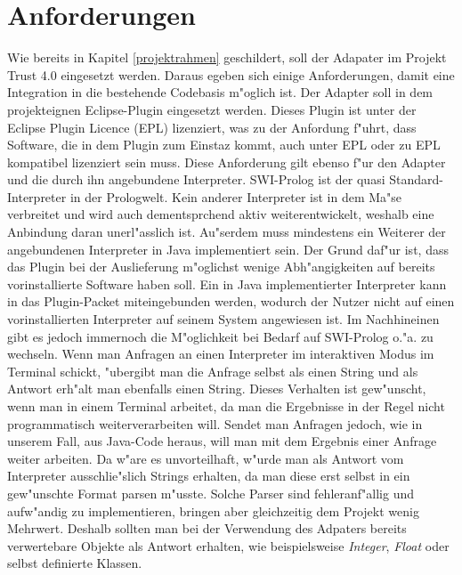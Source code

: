 

\section{Anforderungen}
\label{anfo}
Wie bereits in Kapitel \ref{projektrahmen} geschildert, soll der Adapater im Projekt Trust 4.0 eingesetzt werden. Daraus egeben sich einige Anforderungen, damit eine Integration in die bestehende Codebasis m"oglich ist.\newline
Der Adapter soll in dem projekteignen Eclipse-Plugin eingesetzt werden. Dieses Plugin ist unter der Eclipse Plugin Licence (EPL)\cite{epl} lizenziert, was zu der Anfordung f"uhrt, dass Software, die in dem Plugin zum Einstaz kommt, auch unter EPL oder zu EPL kompatibel lizenziert sein muss. Diese Anforderung gilt ebenso f"ur den Adapter und die durch ihn angebundene Interpreter.\newline
SWI-Prolog\cite{swi} ist der quasi Standard-Interpreter in der Prologwelt. Kein anderer Interpreter ist in dem Ma"se verbreitet und wird auch dementsprchend aktiv weiterentwickelt, weshalb eine Anbindung daran unerl"asslich ist. Au"serdem muss mindestens ein Weiterer der angebundenen Interpreter in Java implementiert sein. Der Grund daf"ur ist, dass das Plugin bei der Auslieferung m"oglichst wenige Abh"angigkeiten auf bereits vorinstallierte Software haben soll. Ein in Java implementierter Interpreter kann in das Plugin-Packet miteingebunden werden, wodurch der Nutzer nicht auf einen vorinstallierten Interpreter auf seinem System angewiesen ist. Im Nachhineinen gibt es jedoch immernoch die M"oglichkeit bei Bedarf auf SWI-Prolog o."a. zu wechseln.\newline
Wenn man Anfragen an einen Interpreter im interaktiven Modus im Terminal schickt, "ubergibt man die Anfrage selbst als einen String und als Antwort erh"alt man ebenfalls einen String. Dieses Verhalten ist gew"unscht, wenn man in einem Terminal arbeitet, da man die Ergebnisse in der Regel nicht programmatisch weiterverarbeiten will. Sendet man Anfragen jedoch, wie in unserem Fall, aus Java-Code heraus, will man mit dem Ergebnis einer Anfrage weiter arbeiten. Da w"are es unvorteilhaft, w"urde man als Antwort vom Interpreter ausschlie"slich Strings erhalten, da man diese erst selbst in ein gew"unschte Format parsen m"usste. Solche Parser sind fehleranf"allig und aufw"andig zu implementieren, bringen aber gleichzeitig dem Projekt wenig Mehrwert. Deshalb sollten
man bei der Verwendung des Adpaters bereits verwertebare Objekte als Antwort erhalten, wie beispielsweise \emph{Integer}, \emph{Float} oder selbst definierte Klassen.

